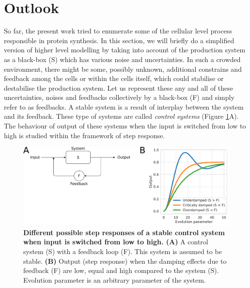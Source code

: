 \section{Outlook}
So far, the present work tried to enumerate some of the cellular level process responsible in protein synthesis. In this section, we will briefly do a simplified version of higher level modelling by taking into account of the production system as a black-box (S) which has various noise and uncertainties. In such a crowded environment, there might be some, possibly unknown, additional constrains and feedback among the cells or within the cells itself, which could stabilise or destabilise the production system. Let us represent these any and all of these uncertainties, noises and feedbacks collectively by a black-box (F) and simply refer to as feedbacks. A stable system is a result of interplay between the system and its feedback. These type of systems are called \textit{control systems} (Figure \ref{fig:control_system}A). The behaviour of output of these systems when the input is switched from low to high is studied within the framework of step response.

\begin{figure}[htbp!]
\center
\includegraphics[width=1\textwidth]{chapters/Discussion/Figures/control_system.png}
\caption[Different possible step responses of a stable control system when input is switched from low to high.]{\textbf{Different possible step responses of a stable control system when input is switched from low to high. (A)} A control system (S) with a feedback loop (F). This system is assumed to be stable. \textbf{(B)} Output (step response) when the damping effects due to feedback (F) are low, equal and high compared to the system (S). Evolution parameter is an arbitrary parameter of the system.}%
\label{fig:control_system}
\end{figure}

